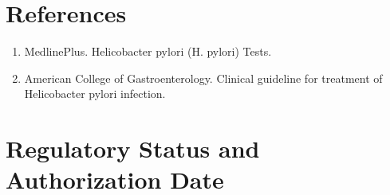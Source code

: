 \section*{References}
\begin{enumerate}
  \item MedlinePlus. Helicobacter pylori (H. pylori) Tests.
  \item American College of Gastroenterology. Clinical guideline for treatment of Helicobacter pylori infection.
\end{enumerate}

\clearpage


\section*{Regulatory Status and Authorization Date}

\clearpage
